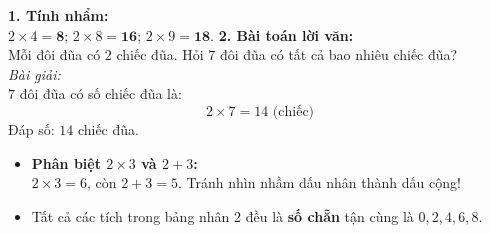 \documentclass[11pt,a4paper]{article}
\begin{document}
\vspace{-1.5mm}
\noindent
\begin{minipage}[t]{0.49\textwidth}\vspace{0pt}
\begin{tcolorbox}[
  enhanced,
  colback=green!4!white,
  colframe=green!60!black,
  arc=2mm, boxrule=0.8pt,
  left=2mm, right=2mm, top=1.8mm, bottom=1.8mm,
  title={\footnotesize\bfseries\color{white}\faCheckCircle\ 4. Ví dụ thực hành chuẩn mực}
]
{\footnotesize
\textbf{1. Tính nhẩm:}\\
$2 \times 4 = \mathbf{8}$; $2 \times 8 = \mathbf{16}$; $2 \times 9 = \mathbf{18}$.
\textbf{2. Bài toán lời văn:}\\
Mỗi đôi đũa có $2$ chiếc đũa. Hỏi $7$ đôi đũa có tất cả bao nhiêu chiếc đũa?\\
\textit{Bài giải:}\\
$7$ đôi đũa có số chiếc đũa là:
$$2 \times 7 = 14\text{ (chiếc)}$$
Đáp số: $14$ chiếc đũa.
}
\end{tcolorbox}
\end{minipage}
\hfill
\begin{minipage}[t]{0.49\textwidth}\vspace{0pt}
\begin{tcolorbox}[
  enhanced,
  colback=red!4!white,
  colframe=red!75!black,
  arc=2mm, boxrule=0.8pt,
  left=2mm, right=2mm, top=1.8mm, bottom=1.8mm,
  title={\footnotesize\bfseries\color{white}\faExclamationTriangle\ 5. Mẹo tránh bẫy trắc nghiệm}
]
{\footnotesize
\begin{itemize}\setlength{\itemsep}{1pt}\setlength{\leftskip}{-2.5mm}
  \item \textbf{Phân biệt $2 \times 3$ và $2 + 3$:}\\
  $2 \times 3 = 6$, còn $2 + 3 = 5$. Tránh nhìn nhầm dấu nhân thành dấu cộng!
  \item Tất cả các tích trong bảng nhân 2 đều là \textbf{số chẵn} tận cùng là $0, 2, 4, 6, 8$.
\end{itemize}
}
\end{tcolorbox}
\end{minipage}
\end{document}
